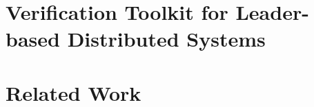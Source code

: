 \documentclass[letterpaper,11pt]{yalephd}
\begin{document}
\chapter{Verification Toolkit for Leader-based Distributed Systems }
\label{chapter:witness-passing}











\chapter{Related Work} 
\label{chapter:related}


%

\backmatter


\end{document}
